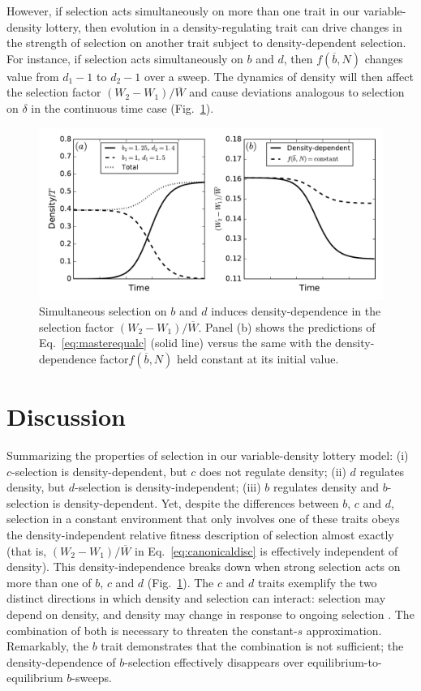 \documentclass[12pt]{article}
\begin{document}
However, if selection acts simultaneously on more than one trait in our variable-density lottery, then evolution in a density-regulating trait can drive changes in the strength of selection on another trait subject to density-dependent selection. For instance, if selection acts simultaneously on $b$ and $d$, then $f(\overline{b},N)$ changes value from $d_1-1$ to $d_2-1$ over a sweep. The dynamics of density will then affect the selection factor $(W_2-W_1)/\overline{W}$ and cause deviations analogous to selection on $\delta$ in the continuous time case (Fig.~\ref{fig:bdsweep}). 

\begin{figure}
\centering
\includegraphics[scale=0.8]{bdsweep.pdf}
\caption{\label{fig:bdsweep} Simultaneous selection on $b$ and $d$ induces density-dependence in the selection factor $(W_2-W_1)/\overline{W}$. Panel (b) shows the predictions of Eq.~\eqref{eq:masterequalc} (solid line) versus the same with the density-dependence factor$f(\overline{b},N)$ held constant at its initial value.}
\end{figure}


\section*{Discussion}

Summarizing the properties of selection in our variable-density lottery model: (i) $c$-selection is density-dependent, but $c$ does not regulate density; (ii) $d$ regulates density, but $d$-selection is density-independent; (iii) $b$ regulates density and $b$-selection is density-dependent. Yet, despite the differences between $b$, $c$ and $d$,  selection in a constant environment that only involves one of these traits obeys the density-independent relative fitness description of selection almost exactly (that is, $(W_2-W_1)/\overline{W}$ in Eq.~\eqref{eq:canonicaldisc} is effectively independent of density). This density-independence breaks down when strong selection acts on more than one of $b$, $c$ and $d$ (Fig.~\ref{fig:bdsweep}). The $c$ and $d$ traits exemplify the two distinct directions in which density and selection can interact: selection may depend on density, and density may change in response to ongoing selection \citep{prout_1980}. The combination of both is necessary to threaten the constant-$s$ approximation. Remarkably, the $b$ trait demonstrates that the combination is not sufficient; the density-dependence of $b$-selection effectively disappears over equilibrium-to-equilibrium $b$-sweeps. 
\end{document}
